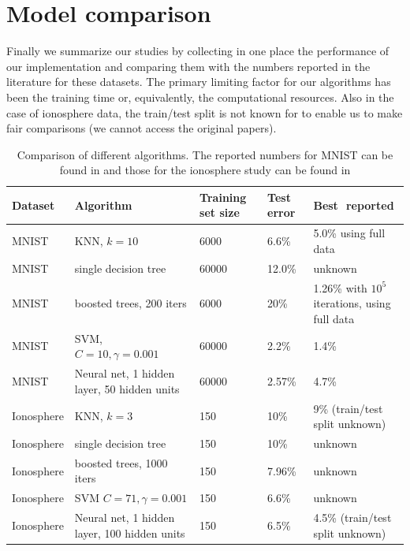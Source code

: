 \documentclass[10pt,letterpaper]{article}
\begin{document}
\section{Model comparison}
Finally we summarize our studies by collecting in one place the performance of our implementation and comparing them with the numbers reported in the literature for these datasets. The primary limiting factor for our algorithms has been the training time or, equivalently, the computational resources. Also in the case of ionosphere data, the train/test split is not known for to enable us to make fair comparisons (we cannot access the original papers). 
\begin{table}[tbp]
	\caption{ Comparison of different algorithms. The reported numbers for MNIST can be found in \cite{mnist} and those for the ionosphere study can be found in \cite{ionosphere}\label{tab3}}
	\centering
    \begin{tabular}{p{2cm}|p{2.75cm}|p{1.2cm}|p{1cm}|p{2.75cm}}
         \hline
            	{\bf Dataset}&{\bf Algorithm} & {\bf Training set size} & {\bf Test error} & {\bf Best \,\,reported}\\ \hline \hline
		MNIST & KNN, $k=10$ & 6000 & 6.6\% & 5.0\% using full data \\ \hline
		MNIST & single decision tree & 60000 & 12.0\% & unknown \\ \hline
		MNIST & boosted trees, 200 iters & 6000 & 20\% & 1.26\% with $10^5$ iterations, using full data \\  \hline
		MNIST & SVM, $C=10, \gamma=0.001$ & 60000 & 2.2\% & 1.4\% \\ \hline 
		MNIST & Neural net, 1 hidden layer, 50 hidden units & 60000 & 2.57\% & 4.7\% \\ \hline
		Ionosphere & KNN, $k=3$ & 150 & 10\% & 9\% (train/test split unknown) \\ \hline
		Ionosphere & single decision tree & 150 & 10\% & unknown \\ \hline
		Ionosphere & boosted trees, 1000 iters & 150 & 7.96\% & unknown \\ \hline
		Ionosphere & SVM $C=71, \gamma=0.001$ & 150 & 6.6\% & unknown \\ \hline
		Ionosphere & Neural net, 1 hidden layer, 100 hidden units & 150 & 6.5\% & 4.5\% (train/test split unknown) \\ \hline 
    \end{tabular}
\end{table}
\end{document}
